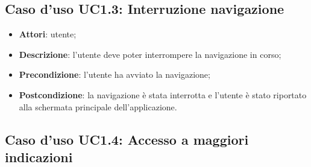 \documentclass[../AnalisiDeiRequisiti.tex]{subfiles}
\begin{document}
\subsection{Caso d'uso UC1.3: Interruzione navigazione}
\begin{itemize}
\item \textbf{Attori}: utente;
\item \textbf{Descrizione}: l'utente deve poter interrompere la navigazione in corso; 
      \item \textbf{Precondizione}: l'utente ha avviato la navigazione;
    \item \textbf{Postcondizione}: la navigazione è stata interrotta e l'utente è stato riportato alla schermata principale dell'applicazione.
  \end{itemize}
\hypertarget{UC1.4}{}
\subsection{Caso d'uso UC1.4: Accesso a maggiori indicazioni}
\end{document}
